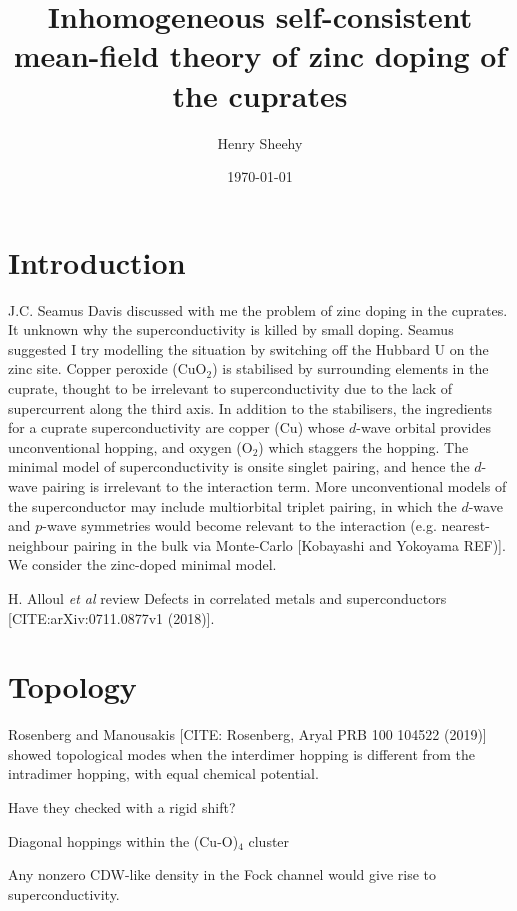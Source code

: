 \title{Inhomogeneous self-consistent mean-field theory of zinc doping of the cuprates}
\author{Henry Sheehy}
\date{ \today }
  
\maketitle
  
\tableofcontents

\section{Introduction}
J.C. Seamus Davis discussed with me the problem of zinc doping in the cuprates. 
It unknown why the superconductivity is killed by small doping.
Seamus suggested I try modelling the situation by switching off the Hubbard U on the zinc site.
Copper peroxide (CuO$_2$) is stabilised by surrounding elements in the cuprate, thought to be irrelevant to superconductivity due to the lack of supercurrent along the third axis.
In addition to the stabilisers, the ingredients for a cuprate superconductivity are copper (Cu) whose $d$-wave orbital provides unconventional hopping, and oxygen (O$_2$) which staggers the hopping. 
The minimal model of superconductivity is onsite singlet pairing, and hence the $d$-wave pairing is irrelevant to the interaction term. 
More unconventional models of the superconductor may include multiorbital triplet pairing, in which the $d$-wave and $p$-wave symmetries would become relevant to the interaction
(e.g. nearest-neighbour pairing in the bulk via Monte-Carlo [Kobayashi and Yokoyama {\color{red}REF})].
We consider the zinc-doped minimal model.

H. Alloul {\it et al} review Defects in correlated metals and superconductors [CITE:arXiv:0711.0877v1 (2018)].

\section{Topology}
Rosenberg and Manousakis [CITE: Rosenberg, Aryal PRB 100 104522 (2019)] showed topological modes when the interdimer hopping is different from the intradimer hopping, with equal chemical potential.

{\color{red} Have they checked with a rigid shift?}

{\color{red} Diagonal hoppings within the (Cu-O)$_4$ cluster}

{\color{red} Any nonzero CDW-like density in the Fock channel would give rise to superconductivity.}


